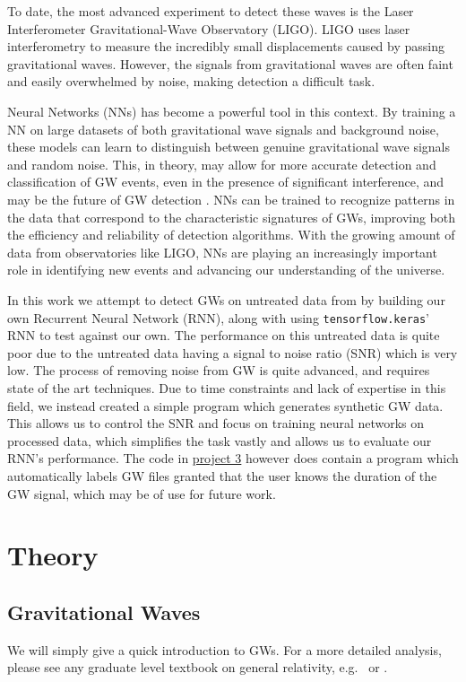 \documentclass[%
reprint,
amsmath,amssymb,
aps,
]{revtex4-2}
\begin{document}
To date, the most advanced experiment to detect these waves is the Laser Interferometer Gravitational-Wave Observatory (LIGO). LIGO uses laser interferometry to measure the incredibly small displacements caused by passing gravitational waves. However, the signals from gravitational waves are often faint and easily overwhelmed by noise, making detection a difficult task.

Neural Networks (NNs) has become a powerful tool in this context. By training a NN on large datasets of both gravitational wave signals and background noise, these models can learn to distinguish between genuine gravitational wave signals and random noise. This, in theory, may allow for more accurate detection and classification of GW events, even in the presence of significant interference, and may be the future of GW detection \cite{Marx:2024wjt, skliris2024}. NNs can be trained to recognize patterns in the data that correspond to the characteristic signatures of GWs, improving both the efficiency and reliability of detection algorithms. With the growing amount of data from observatories like LIGO, NNs are playing an increasingly important role in identifying new events and advancing our understanding of the universe.

In this work we attempt to detect GWs on untreated data from \cite{gwosc} by building our own Recurrent Neural Network (RNN), along with using \texttt{tensorflow.keras}' RNN to test against our own. The performance on this untreated data is quite poor due to the untreated data having a signal to noise ratio (SNR) which is very low. The process of removing noise from GW is quite advanced, and requires state of the art techniques. Due to time constraints and lack of expertise in this field, we instead created a simple program which generates synthetic GW data. This allows us to control the SNR and focus on training neural networks on processed data, which simplifies the task vastly and allows us to evaluate our RNN's performance. The code in \href{https://github.com/EdvardRornes/FYS-STK4155/tree/main/Project3}{project 3} however does contain a program which automatically labels GW files granted that the user knows the duration of the GW signal, which may be of use for future work.

\section{Theory}
\subsection{Gravitational Waves}
We will simply give a quick introduction to GWs. For a more detailed analysis, please see any graduate level textbook on general relativity, e.g.~\cite{Carroll} or \cite{Wald}.
\end{document}
